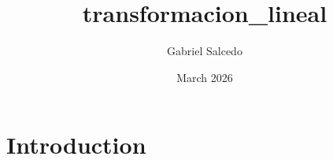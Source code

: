 \documentclass{article}
\title{transformacion_lineal}
\author{Gabriel Salcedo}
\date{March 2026}
\begin{document}
\maketitle

\section{Introduction}
\end{document}
